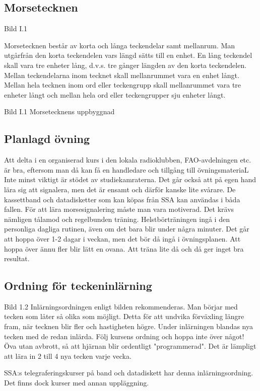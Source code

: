 \subsection{Morsetecknen}
Bild I.1

Morsetecknen består av korta och långa teckendelar samt mellanrum. Man utgårfrån
den korta teckendelen vars längd sätts till en enhet. En lång teckendel skall vara tre
enheter lång, d.v.s. tre gånger längden av den korta teckendelen. Mellan teckendelarna
inom tecknet skall mellanrummet vara en enhet långt. Mellan hela tecknen inom ord
eller teckengrupp skall mellanrummet vara tre enheter långt och mellan hela ord eller
teckengrupper sju enheter långt.


Bild I.1 Morsetecknens uppbyggnad

\subsection{Planlagd övning}

Att delta i en organiserad kurs i den lokala radioklubben, FAO-avdelningen etc. är bra,
eftersom man då kan få en handledare och tillgång till övningsmateriaL Inte minst viktigt
är stödet av studiekamraterna. Det går också att på egen hand lära sig att signalera, men
det är ensamt och därför kanske lite svårare. De kassettband och datadisketter som kan
köpas från SSA kan användas i båda fallen. För att lära morsesignalering måste man
vara motiverad. Det krävs nämligen tålamod och regelbunden träning. Helstbörträningen
ingå i den personliga dagliga rutinen, även om det bara blir under några minuter.
Det går att hoppa över 1-2 dagar i veckan, men det bör då ingå i övningsplanen. Att
hoppa över ännu fler blir lätt en ovana. Att träna lite då och då ger inget bra resultat.

\subsection{Ordning för teckeninlärning}

Bild 1.2
Inlärningsordningen enligt bilden rekommenderas. Man börjar med tecken som låter så
olika som möjligt. Detta för att undvika förväxling längre fram, när tecknen blir fler och
hastigheten högre. Under inlärningen blandas nya tecken med de redan inlärda. Följ
kursens ordning och hoppa inte över något!
Öva utan avbrott, så att hjärnan blir ordentligt "programmerad". Det är lämpligt att lära
in 2 till 4 nya tecken varje vecka.

SSA:s telegraferingskurser på band och datadiskett har denna inlärningsordning. Det
finns dock kurser med annan uppläggning.

